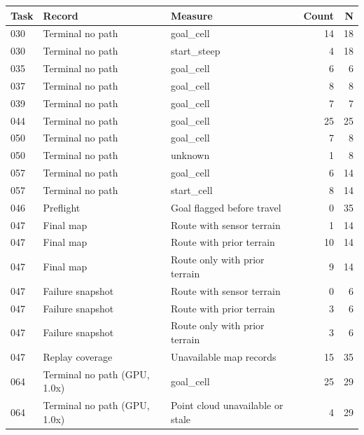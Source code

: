 \begin{tabular}{lllrr}
\hline
Task & Record & Measure & Count & N \\
\hline
030 & Terminal no path & goal\_cell & 14 & 18 \\
030 & Terminal no path & start\_steep & 4 & 18 \\
035 & Terminal no path & goal\_cell & 6 & 6 \\
037 & Terminal no path & goal\_cell & 8 & 8 \\
039 & Terminal no path & goal\_cell & 7 & 7 \\
044 & Terminal no path & goal\_cell & 25 & 25 \\
050 & Terminal no path & goal\_cell & 7 & 8 \\
050 & Terminal no path & unknown & 1 & 8 \\
057 & Terminal no path & goal\_cell & 6 & 14 \\
057 & Terminal no path & start\_cell & 8 & 14 \\
046 & Preflight & Goal flagged before travel & 0 & 35 \\
047 & Final map & Route with sensor terrain & 1 & 14 \\
047 & Final map & Route with prior terrain & 10 & 14 \\
047 & Final map & Route only with prior terrain & 9 & 14 \\
047 & Failure snapshot & Route with sensor terrain & 0 & 6 \\
047 & Failure snapshot & Route with prior terrain & 3 & 6 \\
047 & Failure snapshot & Route only with prior terrain & 3 & 6 \\
047 & Replay coverage & Unavailable map records & 15 & 35 \\
064 & Terminal no path (GPU, 1.0x) & goal\_cell & 25 & 29 \\
064 & Terminal no path (GPU, 1.0x) & Point cloud unavailable or stale & 4 & 29 \\
\hline
\end{tabular}
